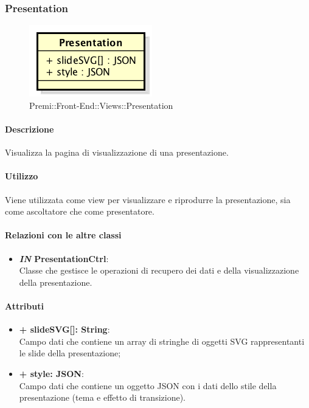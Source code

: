 	
\subsubsection{Presentation}
	\begin{figure}[h]
		\centering
		\includegraphics[width=0.3\linewidth]{img/premi_front_end_views_presentation}
		\caption[Premi::Front-End::Views::Presentation]{Premi::Front-End::Views::Presentation}
	\end{figure}
	
	\paragraph{Descrizione}
	Visualizza la pagina di visualizzazione di una presentazione.
	
	\paragraph{Utilizzo}
	Viene utilizzata come view per visualizzare e riprodurre la presentazione, sia come ascoltatore che come presentatore.
	
	\paragraph{Relazioni con le altre classi}
	\begin{itemize}
		\item \textbf{\textit{IN} PresentationCtrl}:\\
			Classe che gestisce le operazioni di recupero dei dati e della visualizzazione della presentazione.
	\end{itemize}
	
	\paragraph{Attributi}
	\begin{itemize}
		\item \textbf{+ slideSVG[]: String}:\\
		Campo dati che contiene un array di stringhe di oggetti SVG rappresentanti le slide della presentazione;
		\item \textbf{+ style: JSON}: \\
		Campo dati che contiene un oggetto JSON con i dati dello stile della presentazione (tema e effetto di transizione).
	\end{itemize}
\newpage
	
